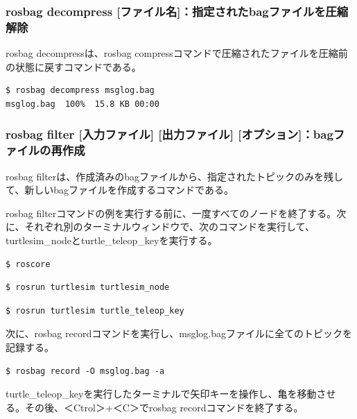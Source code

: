 \subsubsection{rosbag decompress [ファイル名]：指定されたbagファイルを圧縮解除}

rosbag decompressは、rosbag compressコマンドで圧縮されたファイルを圧縮前の状態に戻すコマンドである。

\begin{lstlisting}[language=ROS]
$ rosbag decompress msglog.bag
msglog.bag  100%  15.8 KB 00:00
\end{lstlisting}

\subsubsection{rosbag filter [入力ファイル] [出力ファイル] [オプション]：bagファイルの再作成}

rosbag filterは、作成済みのbagファイルから、指定されたトピックのみを残して、新しいbagファイルを作成するコマンドである。

rosbag filterコマンドの例を実行する前に、一度すべてのノードを終了する。次に、それぞれ別のターミナルウィンドウで、次のコマンドを実行して、turtlesim\_nodeとturtle\_teleop\_keyを実行する。

\begin{lstlisting}[language=ROS]
$ roscore
\end{lstlisting}

\begin{lstlisting}[language=ROS]
$ rosrun turtlesim turtlesim_node
\end{lstlisting}

\begin{lstlisting}[language=ROS]
$ rosrun turtlesim turtle_teleop_key
\end{lstlisting}

次に、rosbag recordコマンドを実行し、msglog.bagファイルに全てのトピックを記録する。

\begin{lstlisting}[language=ROS]
$ rosbag record -O msglog.bag -a
\end{lstlisting}

turtle\_teleop\_keyを実行したターミナルで矢印キーを操作し、亀を移動させる。その後、＜Ctrol＞+＜C＞でrosbag recordコマンドを終了する。

